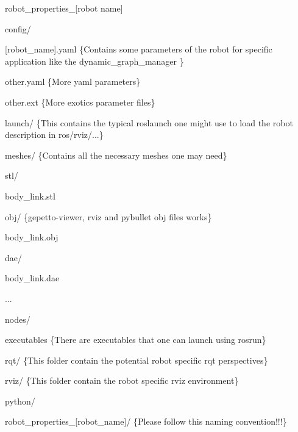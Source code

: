 \begin{DoxyItemize}
\item robot\+\_\+properties\+\_\+\mbox{[}robot name\mbox{]}
\begin{DoxyItemize}
\item config/
\begin{DoxyItemize}
\item \mbox{[}robot\+\_\+name\mbox{]}.yaml \{Contains some parameters of the robot for specific application like the dynamic\+\_\+graph\+\_\+manager \}
\item other.\+yaml \{More yaml parameters\}
\item other.\+ext \{More exotics parameter files\}
\end{DoxyItemize}
\item launch/ \{This contains the typical roslaunch one might use to load the robot description in ros/rviz/...\}
\item meshes/ \{Contains all the necessary meshes one may need\}
\begin{DoxyItemize}
\item stl/
\begin{DoxyItemize}
\item body\+\_\+link.\+stl
\end{DoxyItemize}
\item obj/ \{gepetto-\/viewer, rviz and pybullet obj files works\}
\begin{DoxyItemize}
\item body\+\_\+link.\+obj
\end{DoxyItemize}
\item dae/
\begin{DoxyItemize}
\item body\+\_\+link.\+dae
\end{DoxyItemize}
\item ...
\end{DoxyItemize}
\item nodes/
\begin{DoxyItemize}
\item executables \{There are executables that one can launch using rosrun\}
\end{DoxyItemize}
\item rqt/ \{This folder contain the potential robot specific rqt perspectives\}
\item rviz/ \{This folder contain the robot specific rviz environment\}
\item python/
\begin{DoxyItemize}
\item robot\+\_\+properties\+\_\+\mbox{[}robot\+\_\+name\mbox{]}/ \{Please follow this naming convention!!!\}

\end{DoxyItemize}
\end{DoxyItemize}
\end{DoxyItemize}
